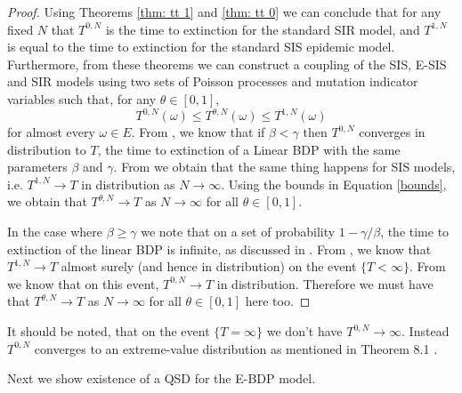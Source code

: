 \documentclass[smallextended]{svjour3}       %
\begin{document}
\begin{proof}
	Using Theorems \ref{thm: tt 1} and \ref{thm: tt 0} we can conclude that for any fixed $N$ that $T^{0,N}$ is the time to extinction for the standard SIR model, and $T^{1,N}$ is equal to the time to extinction for the standard SIS epidemic model. Furthermore, from these theorems we can construct a coupling of the SIS, E-SIS and SIR models using two sets of Poisson processes and mutation indicator variables such that, for any $\theta \in [0,1]$,
\begin{equation}\label{bounds}
		T^{0,N}(\omega) \leq T^{\theta,N}(\omega) \leq T^{1,N}(\omega)
\end{equation}
for almost every $\omega\in E$. From \cite{barbour1975}, we know that if $\beta < \gamma$ then $T^{0,N}$ converges in distribution to $T$, the time to extinction of a Linear BDP with the same parameters $\beta$ and $\gamma$. From \cite{andersson1998} we obtain that the same thing happens for SIS models, i.e. $T^{1,N} \rightarrow T$ in distribution as $N \rightarrow \infty$. Using the bounds in Equation \eqref{bounds}, we obtain that $T^{\theta,N} \rightarrow T$ as $N \rightarrow \infty$ for all $\theta\in[0,1]$. 
	
	In the case where $\beta \geq \gamma$ we note that on a set of probability $1 - \gamma/\beta$, the time to extinction of the linear BDP is infinite, as discussed in \cite{Anderson1991}. From \cite{andersson1998}, we know that $T^{1,N} \rightarrow T$ almost surely (and hence in distribution) on the event $\{T < \infty \}$. From \cite{barbour1975} we know that on this event, $T^{0,N} \rightarrow T$ in distribution. Therefore we must have that $T^{\theta,N} \rightarrow T$ as $N \rightarrow \infty$ for all $\theta\in[0,1]$ here too. 
\end{proof}
It should be noted, that on the event $\{T = \infty\}$ we don't have $T^{0,N} \rightarrow \infty$. Instead $T^{0,N}$ converges to an extreme-value distribution as mentioned in Theorem 8.1 \cite{Andersson2000}.

Next we show existence of a QSD for the E-BDP model.
\end{document}
